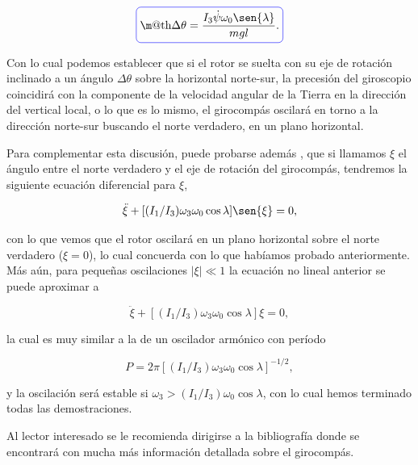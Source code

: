\documentclass[a4paper,10pt]{article}
\makeatletter
\numberwithin{equation}{section}
\newcommand*{\boxcolor}{blue}
\renewcommand{\boxed}[1]{\textcolor{\boxcolor}{%
\tikz[baseline={([yshift=-1ex]current bounding box.center)}] \node [rectangle, minimum width=1ex,rounded corners,draw] {\normalcolor\m@th$\displaystyle#1$};}}
\makeatother
\begin{document}
\begin{equation}
 \boxed{\Delta\theta = \frac{I_3\dot{\psi}\omega_0\sen{\lambda}}{mgl}.}
\end{equation}

Con lo cual podemos establecer que si el rotor se suelta con su eje de rotación inclinado 
a un ángulo $\Delta\theta$ sobre la horizontal norte-sur, la precesión del giroscopio 
coincidirá con la componente de la velocidad angular de la Tierra en la dirección del 
vertical local, o lo que es lo mismo, el girocompás oscilará en torno a la dirección 
norte-sur buscando el norte verdadero, en un plano horizontal.

\vspace{.3cm}

Para complementar esta discusión, puede probarse además \cite{delange}, que si llamamos $\xi$ el ángulo entre el norte 
verdadero y el eje de rotación del girocompás, tendremos la siguiente ecuación diferencial 
para $\xi$,

\begin{equation}
 \ddot{\xi} + [(I_1/I_3)\omega_3\omega_0\cos{\lambda}]\sen{\xi} = 0, 
\end{equation}

con lo que vemos que el rotor oscilará en un plano horizontal sobre el norte verdadero 
($\xi=0$), lo cual concuerda con lo que habíamos probado anteriormente. Más aún, para 
pequeñas oscilaciones $|\xi| \ll 1$ la ecuación no lineal anterior se puede 
aproximar a 

\begin{equation}
 \ddot{\xi} + [(I_1/I_3)\omega_3\omega_0\cos{\lambda}]\xi = 0, 
\end{equation}

la cual es muy similar a la de un oscilador armónico con período 

\begin{equation}
 P = 2\pi[(I_1/I_3)\omega_3\omega_0\cos{\lambda}]^{-1/2},
\end{equation}

y la oscilación será estable \cite{spivak} si $\omega_3 >(I_1/I_3)\omega_0\cos{\lambda}$, 
con lo cual hemos terminado todas las demostraciones.

\vspace{.3cm}

Al lector interesado se le recomienda dirigirse a la bibliografía donde se encontrará 
con mucha más información detallada sobre el girocompás. 

\vspace{.3cm}
\end{document}
